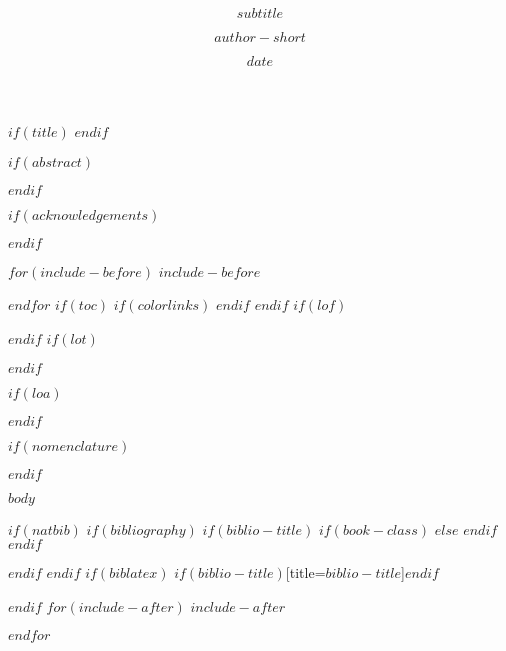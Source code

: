 \documentclass[$if(fontsize)$$fontsize$,$endif$$if(lang)$$lang$,$endif$$if(papersize)$$papersize$paper,$endif$$for(classoption)$$classoption$$sep$,$endfor$]{$documentclass$}
\title{\bfseries\AorE{$titel$\\[1ex]\normalfont\small\itshape(``$title$'')}{$title$}}
\subtitle{$subtitle$}
\author{$author-short$}{$author$ \\ \\ \texttt{[image: \$logo\$]}}
\date{$date$}
\begin{document}
 \frontmatter
 $if(title)$
 \TitlePage
 $endif$

\DeclarationPage

$if(abstract)$

\clearpage
$endif$

$if(acknowledgements)$

\clearpage
$endif$

$for(include-before)$
$include-before$

$endfor$
$if(toc)$
{
$if(colorlinks)$
\hypersetup{linkcolor=$if(toccolor)$$toccolor$$else$black$endif$}
$endif$
\setcounter{tocdepth}{$toc-depth$}
\tableofcontents
\clearpage
}
$endif$
$if(lof)$
\setcounter{lofdepth}{2}
\listoffigures
\clearpage
$endif$
$if(lot)$
\listoftables
\clearpage
$endif$

$if(loa)$

$endif$

$if(nomenclature)$

$endif$

\mainmatter
$body$

\backmatter
$if(natbib)$
$if(bibliography)$
$if(biblio-title)$
$if(book-class)$
\renewcommand\bibname{$biblio-title$}
$else$
\renewcommand\refname{$biblio-title$}
$endif$
$endif$


$endif$
$endif$
$if(biblatex)$
\printbibliography$if(biblio-title)$[title=$biblio-title$]$endif$

$endif$
$for(include-after)$
$include-after$

$endfor$
\end{document}
